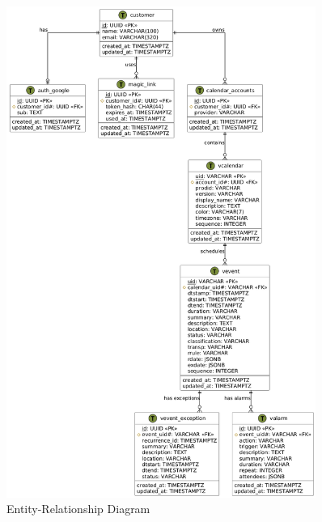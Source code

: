 \begin{figure}[!h]
    \centering
    \includegraphics[width=0.9\textwidth]{images/docs/diagrams/er/database/Database Design.png}
    \caption{Entity-Relationship Diagram}
    \label{fig:er-diagram}
\end{figure}

